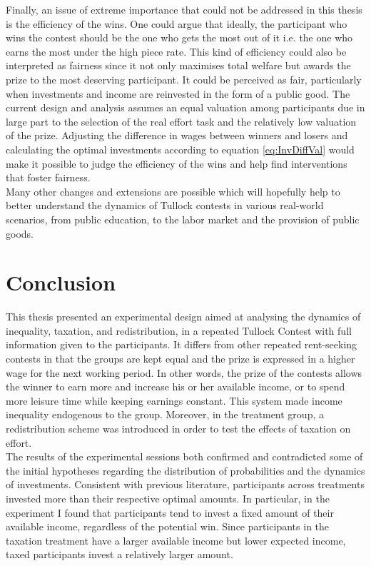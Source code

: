 Finally, an issue of extreme importance that could not be addressed in this thesis is the efficiency of the wins. One could argue that ideally, the participant who wins the contest should be the one who gets the most out of it i.e. the one who earns the most under the high piece rate. This kind of efficiency could also be interpreted as fairness since it not only maximises total welfare but awards the prize to the most deserving participant. It could be perceived as fair, particularly when investments and income are reinvested in the form of a public good. The current design and analysis assumes an equal valuation among participants due in large part to the selection of the real effort task and the relatively low valuation of the prize. Adjusting the difference in wages between winners and losers and calculating the optimal investments according to equation \ref{eq:InvDiffVal} would make it possible to judge the efficiency of the wins and help find interventions that foster fairness.\\

Many other changes and extensions are possible which will hopefully help to better understand the dynamics of Tullock contests in various real-world scenarios, from public education, to the labor market and the provision of public goods.\\

\chapter{Conclusion}
\label{ch:conclusion}

This thesis presented an experimental design aimed at analysing the dynamics of inequality, taxation, and redistribution, in a repeated Tullock Contest with full information given to the participants. It differs from other repeated rent-seeking contests in that the groups are kept equal and the prize is expressed in a higher wage for the next working period. In other words, the prize of the contests allows the winner to earn more and increase his or her available income, or to spend more leisure time while keeping earnings constant. This system made income inequality endogenous to the group. Moreover, in the treatment group, a redistribution scheme was introduced in order to test the effects of taxation on effort.\\

The results of the experimental sessions both confirmed and contradicted some of the initial hypotheses regarding the distribution of probabilities and the dynamics of investments. Consistent with previous literature, participants across treatments invested more than their respective optimal amounts. In particular, in the experiment I found that participants tend to invest a fixed amount of their available income, regardless of the potential win. Since participants in the taxation treatment have a larger available income but lower expected income, taxed participants invest a relatively larger amount.\\

